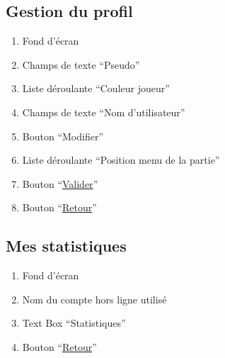 \documentclass{report}
\begin{document}
	\subsection{Gestion du profil}
	
		\hypertarget{Gestion du profil}{}
		\label{Gestion du profil}
		
		
		
		\begin{enumerate}
		  \item Fond d'écran
		  \item Champs de texte ``Pseudo''
		  \item Liste déroulante ``Couleur joueur''
		  \item Champs de texte ``Nom d'utilisateur''
		  \item Bouton ``Modifier''
		  \item Liste déroulante ``Position menu de la partie''
		  \item Bouton ``\hyperlink{Options}{Valider}''
		  \item Bouton ``\hyperlink{Options}{Retour}''
		\end{enumerate}
	
\newpage

	\subsection{Mes statistiques}
	
		
		
		\hypertarget{Statistiques}{}
		\label{Statistiques}
		
		\begin{enumerate}
		  \item Fond d'écran
		  \item Nom du compte hors ligne utilisé
		  \item Text Box ``Statistiques''
		  \item Bouton ``\hyperlink{Acceuil}{Retour}''
		\end{enumerate}
	
\newpage
	
\end{document}
